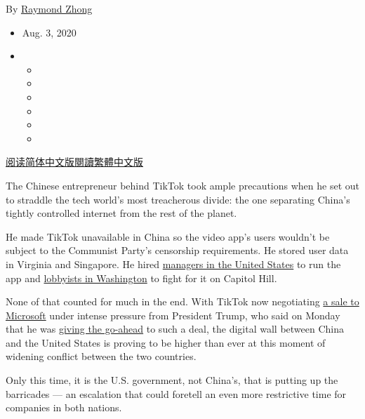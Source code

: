 By \href{https://www.nytimes3xbfgragh.onion/by/raymond-zhong}{Raymond
Zhong}

\begin{itemize}
\item
  Aug. 3, 2020
\item
  \begin{itemize}
  \item
  \item
  \item
  \item
  \item
  \item
  \end{itemize}
\end{itemize}

\href{https://cn.nytimes3xbfgragh.onion/technology/20200804/tiktok-trump-sale-microsoft/}{阅读简体中文版}\href{https://cn.nytimes3xbfgragh.onion/technology/20200804/tiktok-trump-sale-microsoft/zh-hant/}{閱讀繁體中文版}

The Chinese entrepreneur behind TikTok took ample precautions when he
set out to straddle the tech world's most treacherous divide: the one
separating China's tightly controlled internet from the rest of the
planet.

He made TikTok unavailable in China so the video app's users wouldn't be
subject to the Communist Party's censorship requirements. He stored user
data in Virginia and Singapore. He hired
\href{https://www.nytimes3xbfgragh.onion/2020/05/18/business/media/tiktok-ceo-kevin-mayer.html}{managers
in the United States} to run the app and
\href{https://www.nytimes3xbfgragh.onion/2020/07/15/technology/tiktok-washington-lobbyist.html}{lobbyists
in Washington} to fight for it on Capitol Hill.

None of that counted for much in the end. With TikTok now negotiating
\href{https://www.nytimes3xbfgragh.onion/2020/08/02/business/economy/trump-tiktok-china-national-security.html}{a
sale to Microsoft} under intense pressure from President Trump, who said
on Monday that he was
\href{https://www.nytimes3xbfgragh.onion/2020/08/03/technology/trump-tiktok-microsoft.html?action=click\&module=Top\%20Stories\&pgtype=Homepage}{giving
the go-ahead} to such a deal, the digital wall between China and the
United States is proving to be higher than ever at this moment of
widening conflict between the two countries.

Only this time, it is the U.S. government, not China's, that is putting
up the barricades --- an escalation that could foretell an even more
restrictive time for companies in both nations.


